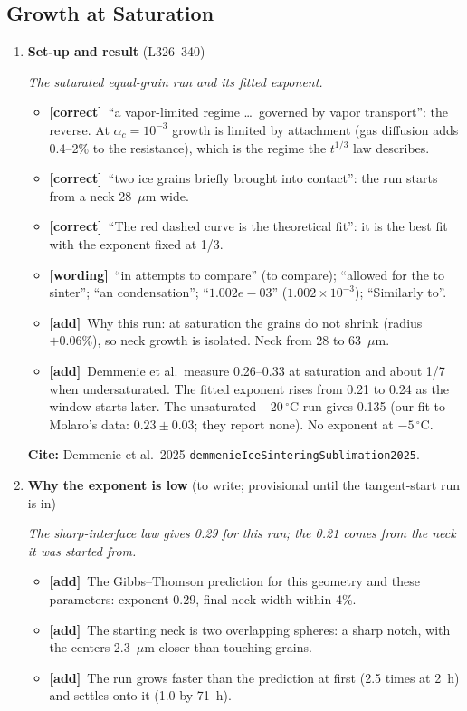 \documentclass[11pt]{article}
\newcommand{\Cite}[1]{\par{\footnotesize\raggedright\textcolor{have}{\textbf{Cite:}} #1\par}}
\newcommand{\Pg}[3]{\item \textbf{#1} {\small(#2)}\par\textit{#3}}
\newcommand{\tC}{\textcolor{miss}{\textbf{[correct]}}\ }
\newcommand{\tG}{\textcolor{stale}{\textbf{[wording]}}\ }
\newcommand{\tA}{\textcolor{have}{\textbf{[add]}}\ }
\begin{document}
\subsection{Growth at Saturation}
\begin{enumerate}
\Pg{Set-up and result}{L326--340}{The saturated equal-grain run and its fitted exponent.}
  \begin{itemize}
  \item \tC ``a vapor-limited regime \ldots\ governed by vapor transport'':
    the reverse. At $\alpha_c = 10^{-3}$ growth is limited by attachment
    (gas diffusion adds 0.4--2\% to the resistance), which is the regime
    the $t^{1/3}$ law describes.
  \item \tC ``two ice grains briefly brought into contact'': the run starts
    from a neck 28~$\mu$m wide.
  \item \tC ``The red dashed curve is the theoretical fit'': it is the best
    fit with the exponent fixed at 1/3.
  \item \tG ``in attempts to compare'' (to compare); ``allowed for the to
    sinter''; ``an condensation''; ``$1.002e-03$'' ($1.002\times10^{-3}$);
    ``Similarly to''.
  \item \tA Why this run: at saturation the grains do not shrink (radius
    $+0.06\%$), so neck growth is isolated. Neck from 28 to 63~$\mu$m.
  \item \tA Demmenie et al.\ measure 0.26--0.33 at saturation and about 1/7
    when undersaturated. The fitted exponent rises from 0.21 to 0.24 as
    the window starts later. The unsaturated $-20\,^{\circ}$C run gives
    0.135 (our fit to Molaro's data: $0.23 \pm 0.03$; they report none). No exponent at $-5\,^{\circ}$C.
  \end{itemize}
  \Cite{Demmenie et al.\ 2025 \texttt{demmenieIceSinteringSublimation2025}.}
\Pg{Why the exponent is low}{to write; provisional until the tangent-start run is in}{The sharp-interface law gives 0.29 for this run; the 0.21 comes from the neck it was started from.}
  \begin{itemize}
  \item \tA The Gibbs--Thomson prediction for this geometry and these
    parameters: exponent 0.29, final neck width within 4\%.
  \item \tA The starting neck is two overlapping spheres: a sharp notch,
    with the centers 2.3~$\mu$m closer than touching grains.
  \item \tA The run grows faster than the prediction at first (2.5 times at
    2~h) and settles onto it (1.0 by 71~h).

\end{itemize}
\end{enumerate}
\end{document}
